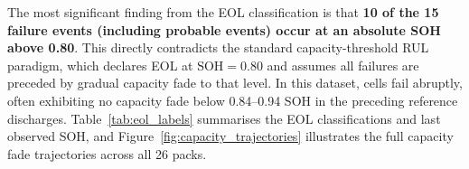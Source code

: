 The most significant finding from the EOL classification is that
\textbf{10 of the 15 failure events (including probable events) occur
at an absolute SOH above 0.80}.  This directly contradicts the
standard capacity-threshold RUL paradigm, which declares EOL at
$\mathrm{SOH} = 0.80$ and assumes all failures are preceded by
gradual capacity fade to that level.  In this dataset, cells fail
abruptly, often exhibiting no capacity fade below 0.84--0.94
SOH in the preceding reference discharges.  Table~\ref{tab:eol_labels}
summarises the EOL classifications and last observed SOH, and
Figure~\ref{fig:capacity_trajectories} illustrates the full capacity
fade trajectories across all 26 packs.

\begin{table}[htbp]
  \centering
  \caption{End-of-life (EOL) classification by pack for the original cohort ($N=23$).}
  \label{tab:eol_labels}
\end{table}


